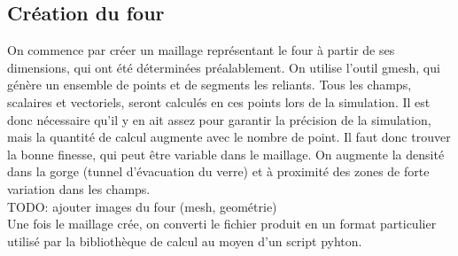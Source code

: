 \documentclass[12pt, a4paper, french, BCOR = 0pt, DIV = 10]{scrartcl}
\begin{document}
    \subsection{Création du four}
    On commence par créer un maillage représentant le four à partir de ses dimensions, qui ont été déterminées préalablement. On utilise l'outil gmesh, qui génère un ensemble de points et de segments les reliants. Tous les champs, scalaires et vectoriels, seront calculés en ces points lors de la simulation. Il est donc nécessaire qu'il y en ait assez pour garantir la précision de la simulation, mais la quantité de calcul augmente avec le nombre de point. Il faut donc trouver la bonne finesse, qui peut être variable dans le maillage. On augmente la densité dans la gorge (tunnel d'évacuation du verre) et à proximité des zones de forte variation dans les champs.\\
    TODO: ajouter images du four (mesh, geométrie)\\
    Une fois le maillage crée, on converti le fichier produit en un format particulier utilisé par la bibliothèque de calcul au moyen d'un script pyhton.
\end{document}
